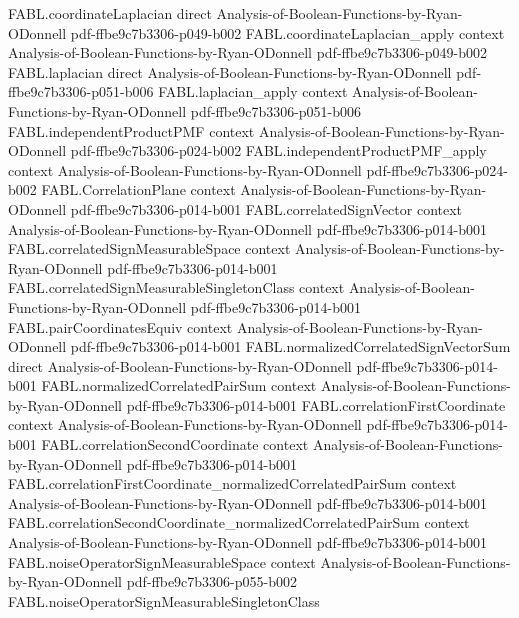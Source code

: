 \begin{theorem}
  {FABL.coordinateLaplacian}
  {direct}
  {Analysis-of-Boolean-Functions-by-Ryan-ODonnell}
  {pdf-ffbe9c7b3306-p049-b002}
\proofstep
  {FABL.coordinateLaplacian_apply}
  {context}
  {Analysis-of-Boolean-Functions-by-Ryan-ODonnell}
  {pdf-ffbe9c7b3306-p049-b002}
\proofstep
  {FABL.laplacian}
  {direct}
  {Analysis-of-Boolean-Functions-by-Ryan-ODonnell}
  {pdf-ffbe9c7b3306-p051-b006}
\proofstep
  {FABL.laplacian_apply}
  {context}
  {Analysis-of-Boolean-Functions-by-Ryan-ODonnell}
  {pdf-ffbe9c7b3306-p051-b006}
\proofstep
  {FABL.independentProductPMF}
  {context}
  {Analysis-of-Boolean-Functions-by-Ryan-ODonnell}
  {pdf-ffbe9c7b3306-p024-b002}
\proofstep
  {FABL.independentProductPMF_apply}
  {context}
  {Analysis-of-Boolean-Functions-by-Ryan-ODonnell}
  {pdf-ffbe9c7b3306-p024-b002}
\proofstep
  {FABL.CorrelationPlane}
  {context}
  {Analysis-of-Boolean-Functions-by-Ryan-ODonnell}
  {pdf-ffbe9c7b3306-p014-b001}
\proofstep
  {FABL.correlatedSignVector}
  {context}
  {Analysis-of-Boolean-Functions-by-Ryan-ODonnell}
  {pdf-ffbe9c7b3306-p014-b001}
\proofstep
  {FABL.correlatedSignMeasurableSpace}
  {context}
  {Analysis-of-Boolean-Functions-by-Ryan-ODonnell}
  {pdf-ffbe9c7b3306-p014-b001}
\proofstep
  {FABL.correlatedSignMeasurableSingletonClass}
  {context}
  {Analysis-of-Boolean-Functions-by-Ryan-ODonnell}
  {pdf-ffbe9c7b3306-p014-b001}
\proofstep
  {FABL.pairCoordinatesEquiv}
  {context}
  {Analysis-of-Boolean-Functions-by-Ryan-ODonnell}
  {pdf-ffbe9c7b3306-p014-b001}
\proofstep
  {FABL.normalizedCorrelatedSignVectorSum}
  {direct}
  {Analysis-of-Boolean-Functions-by-Ryan-ODonnell}
  {pdf-ffbe9c7b3306-p014-b001}
\proofstep
  {FABL.normalizedCorrelatedPairSum}
  {context}
  {Analysis-of-Boolean-Functions-by-Ryan-ODonnell}
  {pdf-ffbe9c7b3306-p014-b001}
\proofstep
  {FABL.correlationFirstCoordinate}
  {context}
  {Analysis-of-Boolean-Functions-by-Ryan-ODonnell}
  {pdf-ffbe9c7b3306-p014-b001}
\proofstep
  {FABL.correlationSecondCoordinate}
  {context}
  {Analysis-of-Boolean-Functions-by-Ryan-ODonnell}
  {pdf-ffbe9c7b3306-p014-b001}
\proofstep
  {FABL.correlationFirstCoordinate_normalizedCorrelatedPairSum}
  {context}
  {Analysis-of-Boolean-Functions-by-Ryan-ODonnell}
  {pdf-ffbe9c7b3306-p014-b001}
\proofstep
  {FABL.correlationSecondCoordinate_normalizedCorrelatedPairSum}
  {context}
  {Analysis-of-Boolean-Functions-by-Ryan-ODonnell}
  {pdf-ffbe9c7b3306-p014-b001}
\proofstep
  {FABL.noiseOperatorSignMeasurableSpace}
  {context}
  {Analysis-of-Boolean-Functions-by-Ryan-ODonnell}
  {pdf-ffbe9c7b3306-p055-b002}
\proofstep
  {FABL.noiseOperatorSignMeasurableSingletonClass}

\end{theorem}
